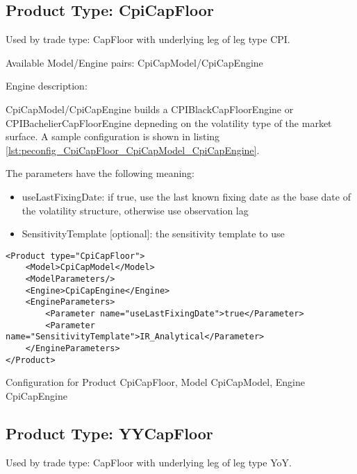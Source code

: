 \subsection{Product Type: CpiCapFloor}

Used by trade type: CapFloor with underlying leg of leg type CPI.

Available Model/Engine pairs: CpiCapModel/CpiCapEngine

Engine description:

CpiCapModel/CpiCapEngine builds a CPIBlackCapFloorEngine or CPIBachelierCapFloorEngine depneding on the volatility type
of the market surface. A sample configuration is shown in listing
\ref{lst:peconfig_CpiCapFloor_CpiCapModel_CpiCapEngine}.

The parameters have the following meaning:

\begin{itemize}
\item useLastFixingDate: if true, use the last known fixing date as the base date of the volatility structure, otherwise
  use observation lag
\item SensitivityTemplate [optional]: the sensitivity template to use 
\end{itemize}

\begin{longlisting}
\begin{verbatim}
<Product type="CpiCapFloor">
    <Model>CpiCapModel</Model>
    <ModelParameters/>
    <Engine>CpiCapEngine</Engine>
    <EngineParameters>
        <Parameter name="useLastFixingDate">true</Parameter>
        <Parameter name="SensitivityTemplate">IR_Analytical</Parameter>
    </EngineParameters>
</Product>
\end{verbatim}
\caption{Configuration for Product CpiCapFloor, Model CpiCapModel, Engine CpiCapEngine}
\label{lst:peconfig_CpiCapFloor_CpiCapModel_CpiCapEngine}
\end{longlisting}

\subsection{Product Type: YYCapFloor}

Used by trade type: CapFloor with underlying leg of leg type YoY.

